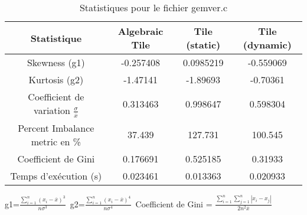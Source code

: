 \documentclass{article}
\begin{document}
\begin{table}[htbp]
  \centering
  \caption{Statistiques pour le fichier gemver.c}
  \begin{tabular}{|c|c|c|c|}
    \hline
    Statistique & Algebraic Tile & Tile (static) & Tile (dynamic) \\ 
    \hline
    Skewness (g1)  & -0.257408 & 0.0985219 & -0.559069 \\ 
    Kurtosis (g2)  & -1.47141 & -1.89693 & -0.70361 \\ 
    Coefficient de variation $ \frac{\sigma}{\overline{x}} $ & 0.313463 & 0.998647 & 0.598304\\ 
    Percent Imbalance metric en \% & 37.439 & 127.731 & 100.545\\ 
    Coefficient de Gini  & 0.176691 & 0.525185 & 0.31933\\ 
    Temps d'exécution (s) &  0.023461    &  0.013363   &  0.020933   \\ 

    \hline
  \end{tabular}
\end{table}
g1=$ \frac{\sum_{i=1}^{n} (x_i - \overline{x})^3}{n\sigma^3} $\
g2=$ \frac{\sum_{i=1}^{n} (x_i - \overline{x})^4}{n\sigma^4} $\
Coefficient de Gini = $ \frac{\sum_{i=1}^{n}\sum_{j=1}^{n} |x_i - x_j|}{2n^2\overline{x}} $\
\newpage
\end{document}
